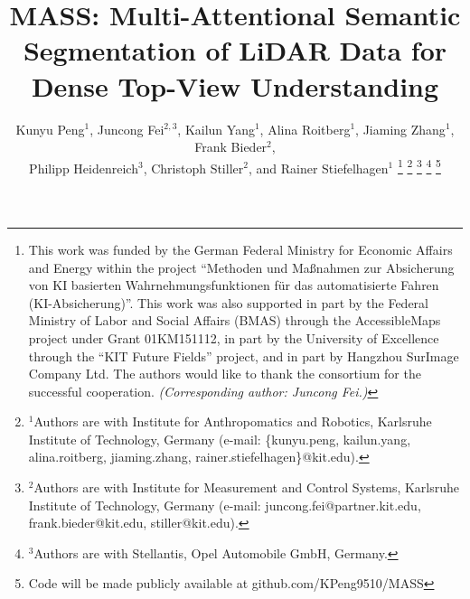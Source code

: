\documentclass[lettersize,journal]{IEEEtran}
\begin{document}
\title{MASS: Multi-Attentional Semantic Segmentation of LiDAR Data for Dense Top-View Understanding}

\author{Kunyu Peng$^{1}$, Juncong Fei$^{2,3}$, Kailun Yang$^{1}$, Alina Roitberg$^{1}$, Jiaming Zhang$^{1}$, Frank Bieder$^{2}$,\\Philipp Heidenreich$^{3}$, Christoph Stiller$^{2}$, and Rainer Stiefelhagen$^{1}$
\thanks{This work was funded by the German Federal Ministry for Economic Affairs and Energy within the project ``Methoden und Maßnahmen zur Absicherung von KI basierten Wahrnehmungsfunktionen f\"ur das automatisierte Fahren (KI-Absicherung)''. 
This work was also supported in part by the Federal Ministry of Labor and Social Affairs (BMAS) through the AccessibleMaps project under Grant 01KM151112, in part by the University of Excellence through the ``KIT Future Fields'' project, and in part by Hangzhou SurImage Company Ltd.
The authors would like to thank the consortium for the successful cooperation.
\textit{(Corresponding author: Juncong Fei.)}}
\thanks{$^{1}$Authors are with Institute for Anthropomatics and Robotics, Karlsruhe Institute of Technology, Germany (e-mail: \{kunyu.peng, kailun.yang, alina.roitberg, jiaming.zhang, rainer.stiefelhagen\}@kit.edu).}
\thanks{$^{2}$Authors are with Institute for Measurement and Control Systems, Karlsruhe Institute of Technology, Germany (e-mail: juncong.fei@partner.kit.edu, frank.bieder@kit.edu, stiller@kit.edu).}
\thanks{$^{3}$Authors are with Stellantis, Opel Automobile GmbH, Germany.}
\thanks{Code will be made publicly available at github.com/KPeng9510/MASS}
}

\maketitle
\end{document}
